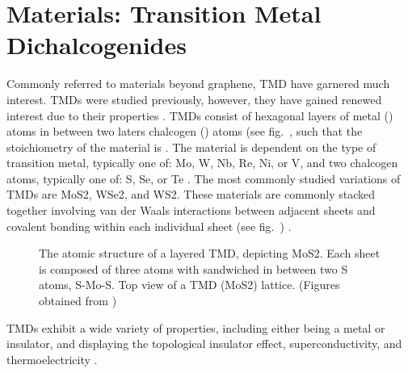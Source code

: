 \section{\Td Materials: Transition Metal Dichalcogenides}\label{sec:tmds}
Commonly referred to \td materials beyond graphene, \ac{TMD} have garnered much interest. \acp{TMD} were studied previously, however, they have gained renewed interest due to their properties \cite{Frindt_Royal1963,Fivaz_PhysRev1967,Mattheiss_PhysRevB1973,Wilson_AdvPhys1969}. \acp{TMD} consist of hexagonal layers of metal () atoms in between two laters chalcogen () atoms (see fig.~, such that the stoichiometry of the material is  \cite{Xu_ChemRev2013}. The material is dependent on the type of transition metal, typically one of: \ac{Mo}, \ac{W}, \ac{Nb}, \ac{Re}, \ac{Ni}, or \ac{V}, and two chalcogen atoms, typically one of: \ac{S}, \ac{Se}, or \ac{Te} \cite{Wilson_AdvPhys1969,Wells_Oxford1984}. The most commonly studied variations of \acp{TMD} are \ac{MoS2}, \ac{WSe2}, and \ac{WS2}. These materials are commonly stacked together involving van der Waals interactions between adjacent sheets and covalent bonding within each individual sheet (see fig.~) \cite{Xu_ChemRev2013}.
\begin{figure}[ht]
	\centering
	\qquad
	\caption[Hexagonal lattice structure of \acs{TMD}]{\protect{} The atomic structure of a layered \acs{TMD}, depicting \acs{MoS2}. Each sheet is composed of three atoms with  sandwiched in between two \acs{S} atoms, \acs{S}-\acs{Mo}-\acs{S}. \protect{} Top view of a \acs{TMD} (\acs{MoS2}) lattice. (Figures obtained from \cite{Kis_NatureNano2011})}
\end{figure}
\noindent \acp{TMD} exhibit a wide variety of properties, including either being a metal or insulator, and displaying the topological insulator effect, superconductivity, and thermoelectricity \cite{Lang_ACSnano2012,Zhang_AdvMat2012,Xie_AppPhysLett2009,Gamble_JournChemPhys1975}.

